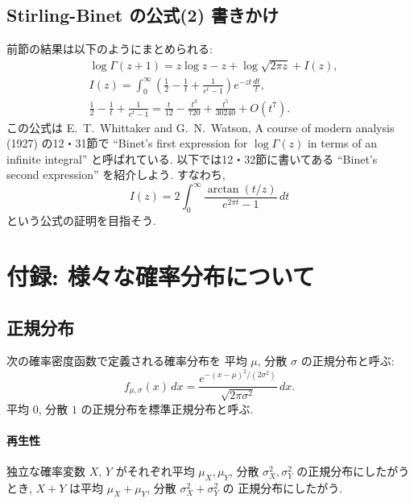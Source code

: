 \documentclass[12pt,twoside]{jarticle}
\theoremstyle{jplain}
\theoremstyle{jplain}
\theoremstyle{jplain}
\numberwithin{theorem}{section}
\numberwithin{equation}{section}
\numberwithin{figure}{section}
\numberwithin{table}{section}
\begin{document}
\subsection{Stirling-Binet の公式(2) 書きかけ}
\label{sec:Binet2}

前節の結果は以下のようにまとめられる:
\begin{align*}
&
\log\Gamma(z+1)=z\log z-z+\log\sqrt{2\pi z}+I(z), 
\\ &
I(z)=\int_0^\infty\left(\frac{1}{2}-\frac{1}{t}+\frac{1}{e^t-1}\right)e^{-zt}\frac{dt}{t},
\\ &
\frac{1}{2}-\frac{1}{t}+\frac{1}{e^t-1}
=\frac{t}{12}-\frac{t^3}{720}+\frac{t^5}{30240}+O(t^7).
\end{align*}
この公式は E.~T.~Whittaker and G.~N.~Watson, A course of modern analysis (1927)
の12・31節で ``Binet's first expression for $\log\Gamma(z)$ in terms of an infinite integral''
と呼ばれている. 以下では12・32節に書いてある ``Binet's second expression'' を紹介しよう.
すなわち, 
\[
I(z)=2\int_0^\infty \frac{\arctan(t/z)}{e^{2\pi t}-1}\,dt
\]
という公式の証明を目指そう.

\bigskip


\section{付録: 様々な確率分布について}
\label{sec:dists}








\subsection{正規分布}
\label{sec:normal}

次の確率密度函数で定義される確率分布を
平均 $\mu$, 分散 $\sigma$ の正規分布と呼ぶ:
\[
f_{\mu,\sigma}(x)\,dx
=\frac{e^{-(x-\mu)^2/(2\sigma^2)}}{\sqrt{2\pi \sigma^2}}\,dx.
\]
平均 $0$, 分散 $1$ の正規分布を標準正規分布と呼ぶ.

\paragraph{再生性} 
独立な確率変数 $X$, $Y$ がそれぞれ平均 $\mu_X,\mu_Y$, 分散 $\sigma_X^2,\sigma_Y^2$
の正規分布にしたがうとき, $X+Y$ は平均 $\mu_X+\mu_Y$, 分散 $\sigma_X^2+\sigma_Y^2$ の
正規分布にしたがう.
\end{document}
